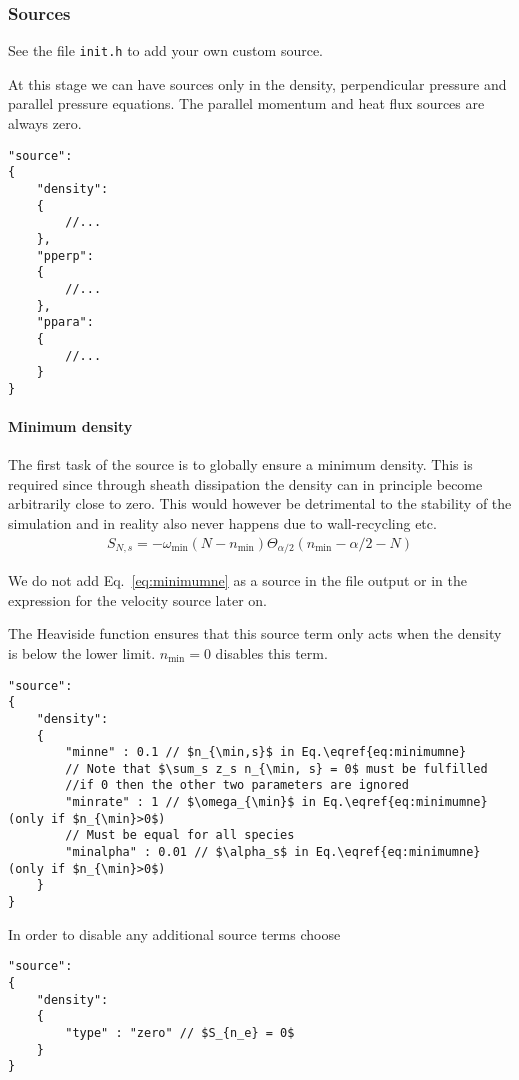 \subsubsection{Sources} \label{sec:sources}
See the file {\tt init.h} to add your own custom source.

At this stage we can have sources only in the density, perpendicular pressure and
parallel pressure equations. The parallel momentum and heat flux sources are always zero.
\begin{verbatim}
"source":
{
    "density":
    {
        //...
    },
    "pperp":
    {
        //...
    },
    "ppara":
    {
        //...
    }
}
\end{verbatim}


\paragraph{Minimum density}

The first task of the source is to globally ensure a minimum density. This
is required since through sheath dissipation the density can in
principle become arbitrarily close to zero. This would however
be detrimental to the stability of the simulation and in reality
also never happens due to wall-recycling etc.
\begin{align}
    S_{N,s} = -\omega_{\min} ( N - n_{\min}) \Theta_{\alpha/2}( n_{\min}-\alpha/2 -N)
    \label{eq:minimumne}
\end{align}
\begin{tcolorbox}[title=Note]
    We do not add Eq.~\eqref{eq:minimumne} as a source in the file output or in
    the expression for the velocity source later on.
\end{tcolorbox}
The Heaviside function ensures that this source term only acts when the density
is below the lower limit. $n_{\min}=0$ disables this term.
\begin{verbatim}
"source":
{
    "density":
    {
        "minne" : 0.1 // $n_{\min,s}$ in Eq.\eqref{eq:minimumne}
        // Note that $\sum_s z_s n_{\min, s} = 0$ must be fulfilled
        //if 0 then the other two parameters are ignored
        "minrate" : 1 // $\omega_{\min}$ in Eq.\eqref{eq:minimumne} (only if $n_{\min}>0$)
        // Must be equal for all species
        "minalpha" : 0.01 // $\alpha_s$ in Eq.\eqref{eq:minimumne} (only if $n_{\min}>0$)
    }
}
\end{verbatim}
\noindent
In order to disable any additional source terms choose
\begin{verbatim}
"source":
{
    "density":
    {
        "type" : "zero" // $S_{n_e} = 0$
    }
}
\end{verbatim}

